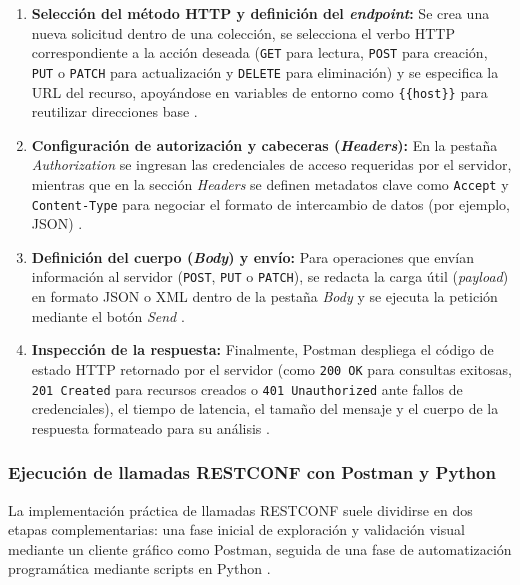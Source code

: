 \documentclass[12pt,a4paper]{article}
\begin{document}
\begin{enumerate}
    \item \textbf{Selección del método HTTP y definición del \textit{endpoint}:} Se crea una nueva solicitud dentro de una colección, se selecciona el verbo HTTP correspondiente a la acción deseada (\texttt{GET} para lectura, \texttt{POST} para creación, \texttt{PUT} o \texttt{PATCH} para actualización y \texttt{DELETE} para eliminación) y se especifica la URL del recurso, apoyándose en variables de entorno como \texttt{\{\{host\}\}} para reutilizar direcciones base \parencite{freecodecamp_postman, postman_apicall}.
    \item \textbf{Configuración de autorización y cabeceras (\textit{Headers}):} En la pestaña \textit{Authorization} se ingresan las credenciales de acceso requeridas por el servidor, mientras que en la sección \textit{Headers} se definen metadatos clave como \texttt{Accept} y \texttt{Content-Type} para negociar el formato de intercambio de datos (por ejemplo, JSON) \parencite{freecodecamp_postman, postman_apicall}.
    \item \textbf{Definición del cuerpo (\textit{Body}) y envío:} Para operaciones que envían información al servidor (\texttt{POST}, \texttt{PUT} o \texttt{PATCH}), se redacta la carga útil (\textit{payload}) en formato JSON o XML dentro de la pestaña \textit{Body} y se ejecuta la petición mediante el botón \textit{Send} \parencite{geeksforgeeks_postman, freecodecamp_postman}.
    \item \textbf{Inspección de la respuesta:} Finalmente, Postman despliega el código de estado HTTP retornado por el servidor (como \texttt{200 OK} para consultas exitosas, \texttt{201 Created} para recursos creados o \texttt{401 Unauthorized} ante fallos de credenciales), el tiempo de latencia, el tamaño del mensaje y el cuerpo de la respuesta formateado para su análisis \parencite{freecodecamp_postman, postman_apicall}.
\end{enumerate}

\subsubsection{Ejecución de llamadas RESTCONF con Postman y Python}

La implementación práctica de llamadas RESTCONF suele dividirse en dos etapas complementarias: una fase inicial de exploración y validación visual mediante un cliente gráfico como Postman, seguida de una fase de automatización programática mediante scripts en Python \parencite{roman2019, cisco_devnet}.
\end{document}
